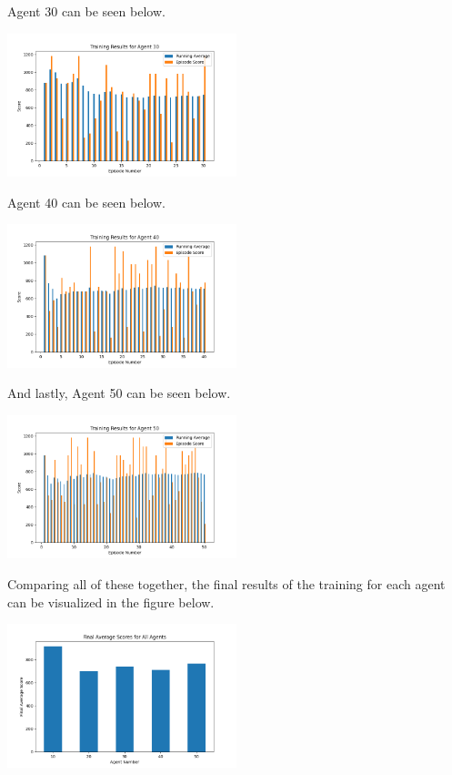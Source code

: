 \documentclass[
	a4paper, %
	10pt, %
	unnumberedsections, %
	twoside, %
]{LTJournalArticle}
\begin{document}
Agent 30 can be seen below.

\begin{center}
	\includegraphics[width=0.5\textwidth]{Figures/Agent 30 Training.png}
\end{center}

Agent 40 can be seen below.

\begin{center}
	\includegraphics[width=0.5\textwidth]{Figures/Agent 40 Training.png}
\end{center}

And lastly, Agent 50 can be seen below.

\begin{center}
	\includegraphics[width=0.5\textwidth]{Figures/Agent 50 Training.png}
\end{center}

Comparing all of these together, the final results of the training for each agent can be visualized in the figure below.

\begin{center}
	\includegraphics[width=0.5\textwidth]{Figures/All Agent Training.png}
\end{center}
\end{document}
